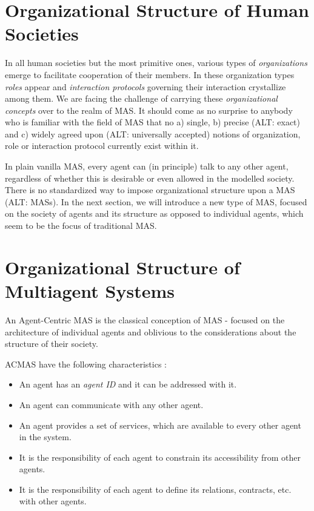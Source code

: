 \section{Organizational Structure of Human Societies}

In all human societies but the most primitive ones, various types of \textit{organizations} emerge to facilitate cooperation of their members.
In these organization types \textit{roles} appear and \textit{interaction protocols} governing their interaction crystallize among them.
We are facing the challenge of carrying these \textit{organizational concepts} over to the realm of MAS.
It should come as no surprise to anybody who is familiar with the field of MAS that no a) single, b) precise (ALT: exact) and c) widely agreed upon (ALT: universally accepted) notions of organization, role or interaction protocol currently exist within it.

In plain vanilla MAS, every agent can (in principle) talk to any other agent, regardless of whether this is desirable or even allowed in the modelled society.
There is no standardized way to impose organizational structure upon a MAS (ALT: MASs). 
In the next section, we will introduce a new type of MAS, focused on the society of agents and its structure as opposed to individual agents, which seem to be the focus of traditional MAS.

\section{Organizational Structure of Multiagent Systems}

An Agent-Centric MAS is the classical conception of MAS - focused on the architecture of individual agents and oblivious to the considerations about the structure of their society.

ACMAS have the following characteristics \cite{Ferber03}:
\begin{itemize}
	\item An agent has an \textit{agent ID} and it can be addressed with it.
	\item An agent can communicate with any other agent.
	\item An agent provides a set of services, which are available to every other agent in the system.
	\item It is the responsibility of each agent to constrain its accessibility from other agents.
	\item It is the responsibility of each agent to define its relations, contracts, etc. with other agents.
\end{itemize}

